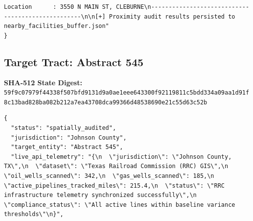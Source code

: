 \documentclass{article}
\begin{document}
\begin{verbatim}
Location      : 3550 N MAIN ST, CLEBURNE\n--------------------------------------------------\n\n[+] Proximity audit results persisted to nearby_facilities_buffer.json"
}
\end{verbatim}


\subsection*{Target Tract: Abstract 545}
\textbf{SHA-512 State Digest:}\\
\texttt{59f9c07979f44338f507bfd9131d9a0ae1eee643300f92119811c5bdd334a09aa1d91f8c13bad828ba082b212a7ea43708dca99366d48538690e21c55d63c52b}
\begin{verbatim}
{
  "status": "spatially_audited",
  "jurisdiction": "Johnson County",
  "target_entity": "Abstract 545",
  "live_api_telemetry": "{\n  \"jurisdiction\": \"Johnson County, TX\",\n  \"dataset\": \"Texas Railroad Commission (RRC) GIS\",\n  \"oil_wells_scanned\": 342,\n  \"gas_wells_scanned\": 185,\n  \"active_pipelines_tracked_miles\": 215.4,\n  \"status\": \"RRC infrastructure telemetry synchronized successfully\",\n  \"compliance_status\": \"All active lines within baseline variance thresholds\"\n}",

\end{verbatim}
\end{document}
